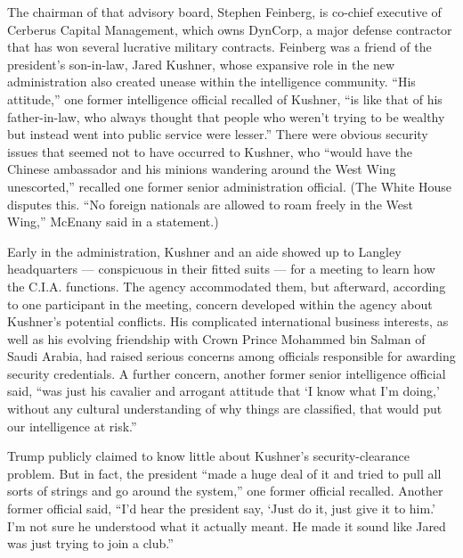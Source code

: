 The chairman of that advisory board, Stephen Feinberg, is co-chief
executive of Cerberus Capital Management, which owns DynCorp, a major
defense contractor that has won several lucrative military contracts.
Feinberg was a friend of the president's son-in-law, Jared Kushner,
whose expansive role in the new administration also created unease
within the intelligence community. ``His attitude,'' one former
intelligence official recalled of Kushner, ``is like that of his
father-in-law, who always thought that people who weren't trying to be
wealthy but instead went into public service were lesser.'' There were
obvious security issues that seemed not to have occurred to Kushner, who
``would have the Chinese ambassador and his minions wandering around the
West Wing unescorted,'' recalled one former senior administration
official. (The White House disputes this. ``No foreign nationals are
allowed to roam freely in the West Wing,'' McEnany said in a statement.)

Early in the administration, Kushner and an aide showed up to Langley
headquarters --- conspicuous in their fitted suits --- for a meeting to
learn how the C.I.A. functions. The agency accommodated them, but
afterward, according to one participant in the meeting, concern
developed within the agency about Kushner's potential conflicts. His
complicated international business interests, as well as his evolving
friendship with Crown Prince Mohammed bin Salman of Saudi Arabia, had
raised serious concerns among officials responsible for awarding
security credentials. A further concern, another former senior
intelligence official said, ``was just his cavalier and arrogant
attitude that `I know what I'm doing,' without any cultural
understanding of why things are classified, that would put our
intelligence at risk.''

Trump publicly claimed to know little about Kushner's security-clearance
problem. But in fact, the president ``made a huge deal of it and tried
to pull all sorts of strings and go around the system,'' one former
official recalled. Another former official said, ``I'd hear the
president say, `Just do it, just give it to him.' I'm not sure he
understood what it actually meant. He made it sound like Jared was just
trying to join a club.''


